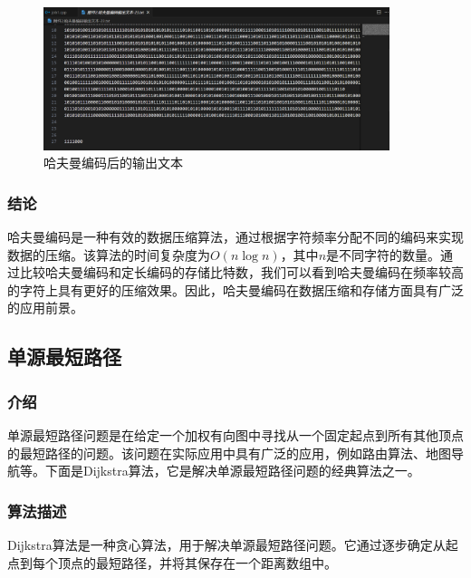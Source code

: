 \documentclass[lang=cn,11pt,a4paper]{elegantpaper}
\begin{document}
\begin{figure}[H]
    \centering
    \includegraphics[width=0.9\textwidth]{image/HuffmanEncode.png}
    \caption{哈夫曼编码后的输出文本}
\end{figure}

\subsubsection{结论}
哈夫曼编码是一种有效的数据压缩算法，通过根据字符频率分配不同的编码来实现数据的压缩。该算法的时间复杂度为$O(n \log n)$，其中$n$是不同字符的数量。通过比较哈夫曼编码和定长编码的存储比特数，我们可以看到哈夫曼编码在频率较高的字符上具有更好的压缩效果。因此，哈夫曼编码在数据压缩和存储方面具有广泛的应用前景。


\subsection{单源最短路径}

\subsubsection{介绍}
单源最短路径问题是在给定一个加权有向图中寻找从一个固定起点到所有其他顶点的最短路径的问题。该问题在实际应用中具有广泛的应用，例如路由算法、地图导航等。下面是Dijkstra算法，它是解决单源最短路径问题的经典算法之一。

\subsubsection{算法描述}
Dijkstra算法是一种贪心算法，用于解决单源最短路径问题。它通过逐步确定从起点到每个顶点的最短路径，并将其保存在一个距离数组中。
\end{document}
